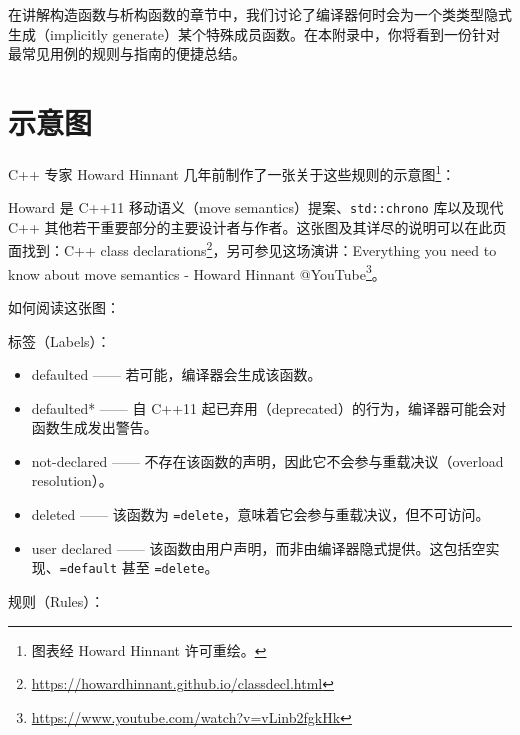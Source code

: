 在讲解构造函数与析构函数的章节中，我们讨论了编译器何时会为一个类类型隐式生成（implicitly generate）某个特殊成员函数。在本附录中，你将看到一份针对最常见用例的规则与指南的便捷总结。

\section{示意图}

C++ 专家 Howard Hinnant 几年前制作了一张关于这些规则的示意图\footnote{图表经 Howard Hinnant 许可重绘。}：


Howard 是 C++11 移动语义（move semantics）提案、\texttt{std::chrono} 库以及现代 C++ 其他若干重要部分的主要设计者与作者。这张图及其详尽的说明可以在此页面找到：C++ class declarations\footnote{\url{https://howardhinnant.github.io/classdecl.html}}，另可参见这场演讲：Everything you need to know about move semantics - Howard Hinnant @YouTube\footnote{\url{https://www.youtube.com/watch?v=vLinb2fgkHk}}。

如何阅读这张图：

标签（Labels）：

\begin{itemize}
\item defaulted —— 若可能，编译器会生成该函数。
\item defaulted* —— 自 C++11 起已弃用（deprecated）的行为，编译器可能会对函数生成发出警告。
\item not-declared —— 不存在该函数的声明，因此它不会参与重载决议（overload resolution）。
\item deleted —— 该函数为 \texttt{=delete}，意味着它会参与重载决议，但不可访问。
\item user declared —— 该函数由用户声明，而非由编译器隐式提供。这包括空实现、\texttt{=default} 甚至 \texttt{=delete}。
\end{itemize}

规则（Rules）：

